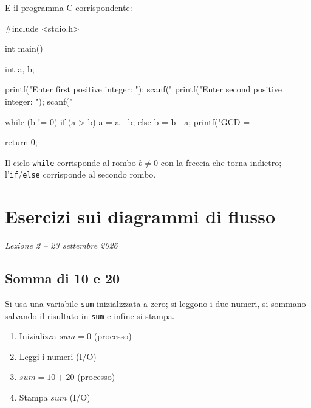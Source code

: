 \documentclass[11pt,a4paper]{article}
\begin{document}
E il programma C corrispondente:
\begin{codice}
#include <stdio.h>

int main() {
    int a, b;

    printf("Enter first positive integer: \n");
    scanf("%
    printf("Enter second positive integer: \n");
    scanf("%

    while (b != 0) {
        if (a > b)
            a = a - b;
        else
            b = b - a;
    }
    printf("GCD = %

    return 0;
}
\end{codice}

\begin{osservazione}
Il ciclo \lstinline|while| corrisponde al rombo $b \neq 0$ con la freccia che
torna indietro; l'\lstinline|if|/\lstinline|else| corrisponde al secondo rombo.
\end{osservazione}

\section[Esercizi sui diagrammi di flusso (Lezione 2 -- 23 settembre 2026)]{Esercizi sui diagrammi di flusso}
\noindent\emph{Lezione 2 -- 23 settembre 2026}
\subsection{Somma di 10 e 20}

Si usa una variabile \texttt{sum} inizializzata a zero; si leggono i due numeri,
si sommano salvando il risultato in \texttt{sum} e infine si stampa.

\begin{enumerate}
    \item Inizializza $sum = 0$ (processo)
    \item Leggi i numeri (I/O)
    \item $sum = 10 + 20$ (processo)
    \item Stampa $sum$ (I/O)
\end{enumerate}

\begin{center}
\end{center}
\end{document}
